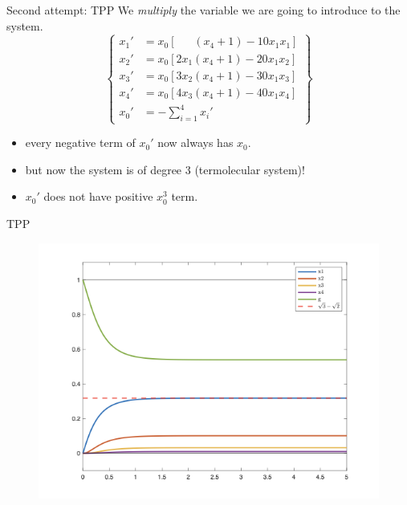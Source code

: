 \documentclass[aspectratio=169]{beamer}
\begin{document}
\begin{frame}[Clean]{Second attempt: TPP}
    We \emph{multiply} the variable we are going to introduce to the system.
    \[
        \left\{\begin{aligned}
x_1' &=   x_0\left[\;\;\;\;\;\,(x_4+1) - 10 x_1x_1\right]
\\
x_2'&=  x_0\left[2x_1 ( x_4 + 1) -20x_1x_2\right]
\\
x_3 ' &=  x_0\left[3x_2 ( x_4 + 1) -30x_1x_3\right]
\\
x_4'  &=  x_0\left[4x_3 ( x_4 + 1) -40x_1x_4\right]
\\
x_0'    &= -\sum\limits_{i=1}^4
x_i'\end{aligned}\right\}
    \]
\begin{itemize}
    \item every negative term of $x_0'$ now always has $x_0$.
    \item but now the system is of degree 3 (termolecular system)!
    \item $x_0'$ does not have positive $x_0^3$ term.
\end{itemize}
\end{frame}
\begin{frame}{TPP}
    \begin{figure}[tb]
        \centering
        \includegraphics[scale=0.45]{tpp}
    \end{figure}
\end{frame}
\end{document}
